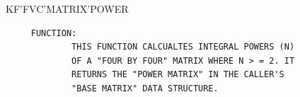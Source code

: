 \begin{frame}
KF'FVC'MATRIX'POWER
\begin{verbatim}
     FUNCTION:
             THIS FUNCTION CALCUALTES INTEGRAL POWERS (N)
             OF A "FOUR BY FOUR" MATRIX WHERE N > = 2. IT
             RETURNS THE "POWER MATRIX" IN THE CALLER'S
             "BASE MATRIX" DATA STRUCTURE.

\end{verbatim}
\end{frame}
